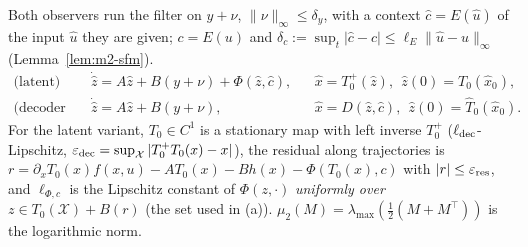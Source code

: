 Both observers run the filter on $y+\nu$, $\|\nu\|_\infty\le\delta_y$, with a context $\hat c=E(\hat u)$ of the input
$\hat u$ they are given; $c=E(u)$ and $\delta_c:=\sup_t|\hat c-c|\le\ell_E\|\hat u-u\|_\infty$ (Lemma~\ref{lem:m2-sfm}).
\begin{align*}
\text{(latent)}\quad &\dot{\hat z}=A\hat z+B(y+\nu)+\Phi(\hat z,\hat c), && \hat x=T_0^+(\hat z),\ \ \hat z(0)=T_0(\hat x_0),\\
\text{(decoder side)}\quad &\dot{\hat z}=A\hat z+B(y+\nu), && \hat x=D(\hat z,\hat c),\ \ \hat z(0)=\hat T_0(\hat x_0).
\end{align*}
For the latent variant, $T_0\in C^1$ is a stationary map with left inverse $T_0^+$ ($\ell_{\rm dec}$-Lipschitz,
$\varepsilon_{\rm dec}=\sup_{\mathcal X}|T_0^+T_0(x)-x|$), the residual along trajectories is
$r=\partial_xT_0(x)f(x,u)-AT_0(x)-Bh(x)-\Phi(T_0(x),c)$ with $|r|\le\varepsilon_{\rm res}$, and $\ell_{\Phi,c}$ is the
Lipschitz constant of $\Phi(z,\cdot)$ \emph{uniformly over} $z\in T_0(\mathcal X)+B(r)$ (the set used in (a)).
$\mu_2(M)=\lambda_{\max}(\tfrac12(M+M^\top))$ is the logarithmic norm.

